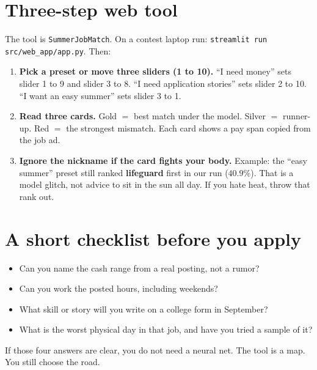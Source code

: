 \documentclass[11pt]{article}
\begin{document}
\section*{Three-step web tool}

The tool is \texttt{SummerJobMatch}.
On a contest laptop run:
\texttt{streamlit run src/web\_app/app.py}.
Then:

\begin{enumerate}[leftmargin=1.4em,itemsep=0.35em]
\item \textbf{Pick a preset or move three sliders (1 to 10).}
``I need money'' sets slider 1 to 9 and slider 3 to 8.
``I need application stories'' sets slider 2 to 10.
``I want an easy summer'' sets slider 3 to 1.
\item \textbf{Read three cards.}
Gold \(=\) best match under the model.
Silver \(=\) runner-up.
Red \(=\) the strongest mismatch.
Each card shows a pay span copied from the job ad.
\item \textbf{Ignore the nickname if the card fights your body.}
Example: the ``easy summer'' preset still ranked \textbf{lifeguard} first in our run (\(40.9\%\)).
That is a model glitch, not advice to sit in the sun all day.
If you hate heat, throw that rank out.
\end{enumerate}

\section*{A short checklist before you apply}

\begin{itemize}[leftmargin=1.2em,itemsep=0.25em]
\item Can you name the cash range from a real posting, not a rumor?
\item Can you work the posted hours, including weekends?
\item What skill or story will you write on a college form in September?
\item What is the worst physical day in that job, and have you tried a sample of it?
\end{itemize}

\noindent
If those four answers are clear, you do not need a neural net.
The tool is a map.
You still choose the road.
\end{document}
